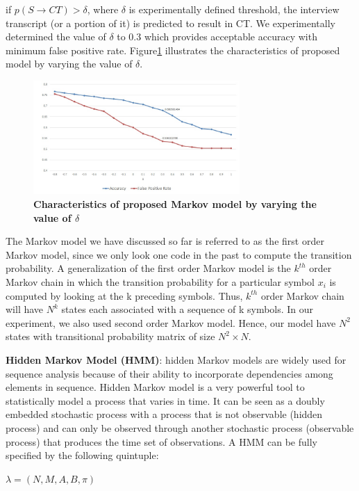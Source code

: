 \documentclass{amia}
\begin{document}
if $p(S\rightarrow CT) > \delta $, where $\delta$ is experimentally defined threshold, the interview transcript (or a portion of it) is predicted to result in CT. We experimentally determined the value of $\delta$ to 0.3 which provides acceptable accuracy with minimum false positive rate. Figure\ref{fig:delta} illustrates the characteristics of proposed model by varying the value of $\delta$. 

\begin{figure}[htb!]
    \centering
    \includegraphics[width=0.70\textwidth]{figures/deltadata.png}
    \caption{\textbf{Characteristics of proposed Markov model by varying the value of $\delta$}}
    \label{fig:delta}
\end{figure}

The Markov model we have discussed so far is referred to as the first order Markov model, since we only look one code in the past to compute the transition probability. A generalization of the first order Markov model is the $k^{th}$ order Markov chain in which the transition probability for a particular symbol $x_i$ is computed by looking at the k preceding symbols. Thus, $k^{th}$ order Markov chain will have $N^{k}$ states each associated with a sequence of k symbols. In our experiment, we also used second order Markov model. Hence, our model have $N^2$ states with transitional probability matrix of size $N^2 \times N$.  

\textbf {Hidden Markov Model (HMM)}: hidden Markov models are widely used for sequence analysis because of their ability to incorporate dependencies among elements in sequence. Hidden Markov model is a very
powerful tool to statistically model a process that varies in time. It can be seen as a doubly embedded stochastic process with a process that is not observable (hidden process) and can only be observed through another stochastic process (observable process) that produces the time set of observations. A HMM can be fully specified by the following quintuple:

\begin{center}
$\lambda = (N, M, A, B, \pi)$
\end{center}
\end{document}
